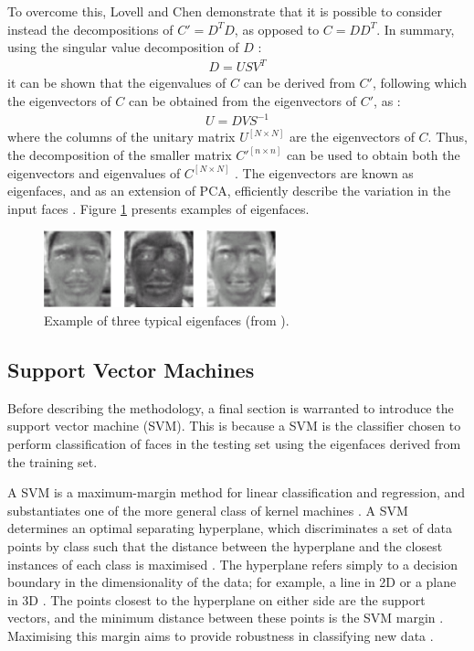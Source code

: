 To overcome this, Lovell and Chen \cite{lovell_2008} demonstrate that it is possible to consider instead the decompositions of $C'=D^TD$, as opposed to $C=DD^T$. In summary, using the singular value decomposition of $D$ \cite{lovell_2008}:
\begin{align}
  D = USV^T
\end{align}
it can be shown that the eigenvalues of $C$ can be derived from $C'$, following which the eigenvectors of $C$ can be obtained from the eigenvectors of $C'$, as \cite{lovell_2008}:
\begin{align}
  U = DVS^{-1}
\end{align}
where the columns of the unitary matrix $U^{[N\times N]}$ are the eigenvectors of $C$. Thus, the decomposition of the smaller matrix $C'^{[n\times n]}$ can be used to obtain both the eigenvectors and eigenvalues of $C^{[N\times N]}$ \cite{lovell_2008}. The eigenvectors are known as eigenfaces, and as an extension of PCA, efficiently describe the variation in the input faces \cite{lovell_2008}. Figure \ref{fig:eigenfaces} presents examples of eigenfaces.

\begin{figure}[ht]
  \centering
  \includegraphics[width=0.6\textwidth]{images/q3_eigenfaces.png}
  \caption{Example of three typical eigenfaces (from \cite{lovell_2008}).}
  \label{fig:eigenfaces}
\end{figure}

\newpage
\subsection{Support Vector Machines}

Before describing the methodology, a final section is warranted to introduce the support vector machine (SVM). This is because a SVM is the classifier chosen to perform classification of faces in the testing set using the eigenfaces derived from the training set.

A SVM is a maximum-margin method for linear classification and regression, and substantiates one of the more general class of kernel machines \cite{alpaydin_2020}. A SVM determines an optimal separating hyperplane, which discriminates a set of data points by class such that the distance between the hyperplane and the closest instances of each class is maximised \cite{alpaydin_2020}. The hyperplane refers simply to a decision boundary in the dimensionality of the data; for example, a line in 2D or a plane in 3D \cite{gandhi_2018}. The points closest to the hyperplane on either side are the support vectors, and the minimum distance between these points is the SVM margin \cite{gandhi_2018}. Maximising this margin aims to provide robustness in classifying new data \cite{gandhi_2018}.

